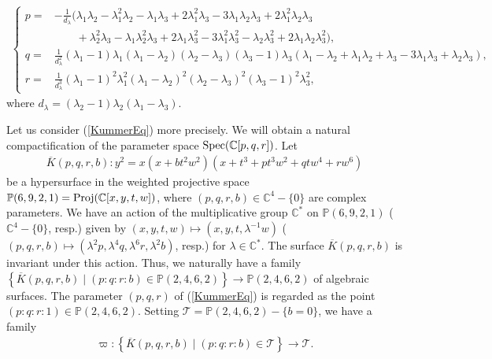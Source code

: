 \documentclass[10pt]{article}
\begin{document}
\begin{align}\label{pqrlambda}
\begin{cases}
 p=& -\frac{1}{d_\lambda} (\lambda_1 \lambda_2 - \lambda_1^2 \lambda_2 - \lambda_1 \lambda_3 + 2 \lambda_1^2 \lambda_3 - 3 \lambda_1 \lambda_2 \lambda_3 + 2 \lambda_1^2 \lambda_2 \lambda_3\\
     &\quad \quad  + \lambda_2^2 \lambda_3 - \lambda_1 \lambda_2^2 \lambda_3 + 2 \lambda_1 \lambda_3^2- 3 \lambda_1^2 \lambda_3^2 - \lambda_2 \lambda_3^2 + 2 \lambda_1 \lambda_2 \lambda_3^2),\\
 q=&\frac{1}{d_\lambda^2} ( \lambda_1 -1) \lambda_1 (\lambda_1 - \lambda_2) (\lambda_2 - \lambda_3) ( \lambda_3 -1) \lambda_3 (\lambda_1 - \lambda_2 + \lambda_1 \lambda_2 + \lambda_3 - 3 \lambda_1 \lambda_3 + \lambda_2 \lambda_3), \\
 r=& \frac{1}{d_\lambda^3} ( \lambda_1 -1)^2 \lambda_1^2 (\lambda_1 - \lambda_2)^2 (\lambda_2 - \lambda_3)^2 ( \lambda_3 -1 )^2 \lambda_3^2 ,
 \end{cases}
\end{align}
 where $d_\lambda= ( \lambda_2 -1 ) \lambda_2 (\lambda_1 - \lambda_3) $.

Let us consider (\ref{KummerEq}) more precisely.
We will obtain a natural compactification of the parameter space ${\rm Spec}(\mathbb{C}[p,q,r])$.
Let
\begin{align}\label{KummerM}
\overline{K}(p,q,r,b) : y^2 = x(x+b t^2 w^2) (x+t^3 + p t^3 w^2+ q t w^4 +r w^6)
\end{align}
be a hypersurface in the weighted projective space $\mathbb{P}(6,9,2,1) = {\rm Proj} (\mathbb{C}[x,y,t,w])$,
where $(p,q,r,b)\in \mathbb{C}^4-\{0\}$ are complex parameters.
We have an action of the multiplicative group $\mathbb{C}^*$ on $\mathbb{P}(6,9,2,1)$ ($\mathbb{C}^4-\{0\}$, resp.)
given by $(x,y,t,w) \mapsto (x,y,t,\lambda^{-1} w)$ ($(p,q,r,b)\mapsto (\lambda^2 p, \lambda^4 q, \lambda^6 r, \lambda^2 b)$, resp.) for $\lambda \in \mathbb{C}^*$.
The surface $\overline{K}(p,q,r,b)$ is invariant under this action.
Thus, we naturally  have a family
$\left\{\overline{K}(p,q,r,b) \mid (p:q:r:b) \in \mathbb{P}(2,4,6,2) \right\} \rightarrow  \mathbb{P}(2,4,6,2) $
of algebraic surfaces.
The parameter $(p,q,r)$ of (\ref{KummerEq}) is regarded as the point $(p:q:r:1) \in \mathbb{P}(2,4,6,2)$.
 Setting
$\mathcal{T}=\mathbb{P}(2,4,6,2) -\{b=0\}$,
we have a family
\begin{align}\label{KummerFamily}
\varpi: \left\{\overline{K}(p,q,r,b) \mid (p:q:r:b) \in \mathcal{T} \right\} \rightarrow  \mathcal{T}.
\end{align}
\end{document}
